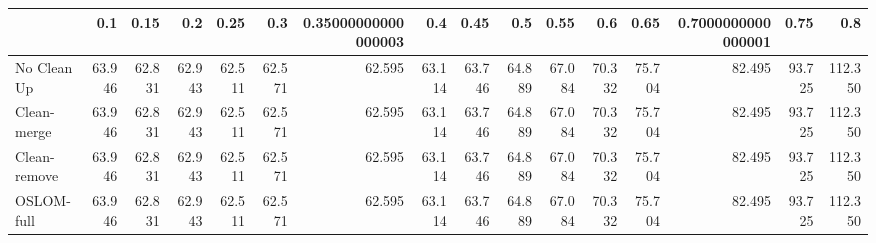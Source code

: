 \begin{tabular}{lrrrrrrrrrrrrrrr}
\toprule
{} &    0.1 &   0.15 &    0.2 &   0.25 &    0.3 & 0.35000000000000003 &    0.4 &   0.45 &    0.5 &   0.55 &    0.6 &   0.65 & 0.7000000000000001 &   0.75 &     0.8 \\
\midrule
No Clean Up  & 63.946 & 62.831 & 62.943 & 62.511 & 62.571 &              62.595 & 63.114 & 63.746 & 64.889 & 67.084 & 70.332 & 75.704 &             82.495 & 93.725 & 112.350 \\
Clean-merge  & 63.946 & 62.831 & 62.943 & 62.511 & 62.571 &              62.595 & 63.114 & 63.746 & 64.889 & 67.084 & 70.332 & 75.704 &             82.495 & 93.725 & 112.350 \\
Clean-remove & 63.946 & 62.831 & 62.943 & 62.511 & 62.571 &              62.595 & 63.114 & 63.746 & 64.889 & 67.084 & 70.332 & 75.704 &             82.495 & 93.725 & 112.350 \\
OSLOM-full   & 63.946 & 62.831 & 62.943 & 62.511 & 62.571 &              62.595 & 63.114 & 63.746 & 64.889 & 67.084 & 70.332 & 75.704 &             82.495 & 93.725 & 112.350 \\
\bottomrule
\end{tabular}
